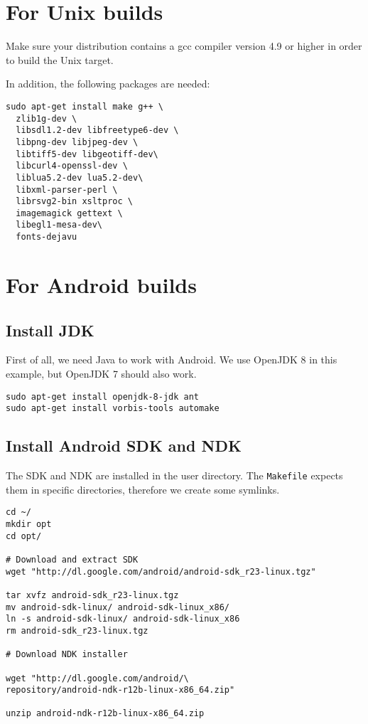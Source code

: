 \section{For Unix builds}

Make sure your distribution contains a gcc compiler version 4.9 or higher in order to build the Unix target.

In addition, the following packages are needed:

\begin{verbatim}
sudo apt-get install make g++ \
  zlib1g-dev \
  libsdl1.2-dev libfreetype6-dev \
  libpng-dev libjpeg-dev \
  libtiff5-dev libgeotiff-dev\
  libcurl4-openssl-dev \
  liblua5.2-dev lua5.2-dev\
  libxml-parser-perl \
  librsvg2-bin xsltproc \
  imagemagick gettext \
  libegl1-mesa-dev\
  fonts-dejavu
\end{verbatim}

\section{For Android  builds}
\subsection{Install JDK}
First of all, we need Java to work with Android. We use OpenJDK 8 in this example, but OpenJDK 7 should also work.

\begin{verbatim}
sudo apt-get install openjdk-8-jdk ant
sudo apt-get install vorbis-tools automake
\end{verbatim}

\subsection{Install Android SDK and NDK}

The SDK and NDK are installed in the user directory. The \texttt{Makefile} expects them in specific directories, therefore we create some symlinks.

\begin{verbatim}
cd ~/
mkdir opt
cd opt/

# Download and extract SDK
wget "http://dl.google.com/android/android-sdk_r23-linux.tgz"

tar xvfz android-sdk_r23-linux.tgz
mv android-sdk-linux/ android-sdk-linux_x86/
ln -s android-sdk-linux/ android-sdk-linux_x86
rm android-sdk_r23-linux.tgz

# Download NDK installer

wget "http://dl.google.com/android/\
repository/android-ndk-r12b-linux-x86_64.zip"

unzip android-ndk-r12b-linux-x86_64.zip
\end{verbatim}

